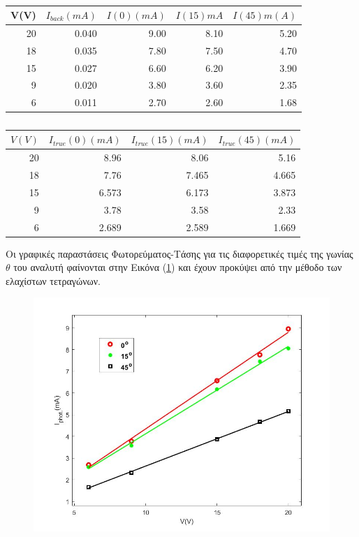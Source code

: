 \documentclass[a4paper]{article}
\begin{document}
\begin{table}[h!] 
	\centering
	\begin{tabular}{r|r|r|r|r}
	V(V) & $I_{back}(mA)$ & $I(0)(mA)$ & $I(15)mA$ & $I(45)m(A)$ \\\hline\hline
	20& 0.040& 9.00& 8.10& 5.20\\
	18& 0.035& 7.80& 7.50& 4.70\\
	15& 0.027& 6.60& 6.20& 3.90\\
	9 & 0.020& 3.80& 3.60& 2.35\\
	6 & 0.011& 2.70& 2.60& 1.68
	\end{tabular}
	
	\begin{tabular}{r|r|r|r}
		$V(V)$ & $I_{true}(0)(mA)$ & $I_{true}(15)(mA)$ & $I_{true}(45)(mA)$ \\\hline\hline	
		20&8.96&8.06&5.16\\
		18&7.76&7.465&4.665\\
		15&6.573&6.173&3.873\\
		 9&3.78&3.58&2.33\\
		 6&2.689&2.589&1.669
	\end{tabular}
	\caption{ }
	\label{mat1}
\end{table}
		
\vspace{-0.5cm}		
Οι γραφικές παραστάσεις Φωτορεύματος-Τάσης για τις διαφορετικές τιμές της γωνίας $\theta$ του αναλυτή φαίνονται στην Εικόνα (\ref{im3}) και έχουν προκύψει από την μέθοδο των ελαχίστων τετραγώνων. 		
	
	\begin{figure}[h!]
		\centering
		\includegraphics[scale=0.31]{plot1.jpg}	
		\caption{ }
		\label{im3}
	\end{figure}			
		
\end{document}
